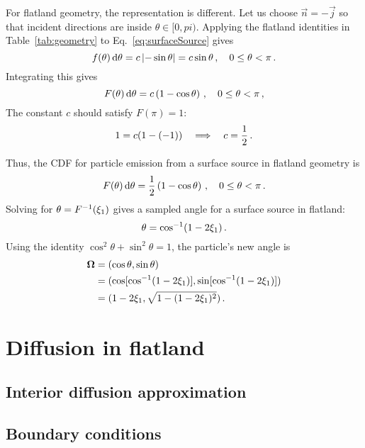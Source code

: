 For flatland geometry, the representation is different. Let us choose
$\vec{n} = -\vec{j}$ so that incident directions are inside $\theta \in [0,
pi)$. Applying the flatland identities in Table~\ref{tab:geometry} to
Eq.~\eqref{eq:surfaceSource} gives
\begin{equation*}
  f(\theta) \mathop{}\!\mathrm{d}\theta = c\left|  -\sin \theta \right| = c \sin \theta
  \,,\quad 0 \le \theta < \pi\,.
\end{equation*}
Integrating this gives
\begin{equation*}
  F(\theta) \mathop{}\!\mathrm{d}\theta = c \left( 1-\cos\theta \right)
  \,,\quad 0 \le \theta < \pi\,,
\end{equation*}
The constant $c$ should satisfy $F(\pi)=1$:
\begin{equation*}
  1 = c (1 - (-1) ) \quad \Longrightarrow \quad c=\frac{1}{2}\,.
\end{equation*}

Thus, the CDF for particle emission from a surface source in flatland geometry
is
\begin{equation*}
  F(\theta) \mathop{}\!\mathrm{d}\theta = \frac{1}{2} \left( 1-\cos\theta \right)
  \,,\quad 0 \le \theta < \pi\,.
\end{equation*}
Solving for $\theta = F^{-1}(\xi_1)$ gives a sampled angle for a surface source
in flatland:
\begin{equation*}
  \theta = \cos^{-1}(1 - 2\xi_1)\,.
\end{equation*}
Using the identity $\cos^2 \theta + \sin^2 \theta = 1$, the particle's new angle is
\begin{align*}
  \bm{\Omega} &= ( \cos \theta, \sin \theta) \\
  &= ( \cos[ \cos^{-1}(1 - 2\xi_1) ], \sin[ \cos^{-1}(1 - 2\xi_1) ] ) \\
  &= (1 - 2\xi_1, \sqrt{1 - (1 - 2\xi_1)^2} )\,.
\end{align*}

\section{Diffusion in flatland}

\subsection{Interior diffusion approximation}

\subsection{Boundary conditions}


